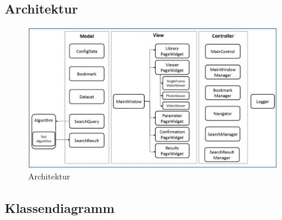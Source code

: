 \subsection{Architektur}

\begin{figure}[H]
\includegraphics[width=1\linewidth]{img/architektur}
\caption{Architektur}
\label{fig:architektur}
\end{figure}

\subsection{Klassendiagramm}